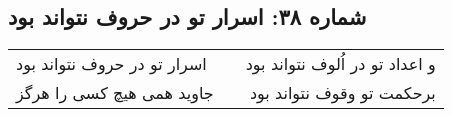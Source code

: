 \begin{center}
\section*{شماره ۳۸: اسرار تو در حروف نتواند بود}
\label{sec:038}
\begin{longtable}{l p{0.5cm} r}
اسرار تو در حروف نتواند بود
&&
و اعداد تو در اُلوف نتواند بود
\\
جاوید همی هیچ کسی را هرگز
&&
برحکمت تو وقوف نتواند بود
\\
\end{longtable}
\end{center}

